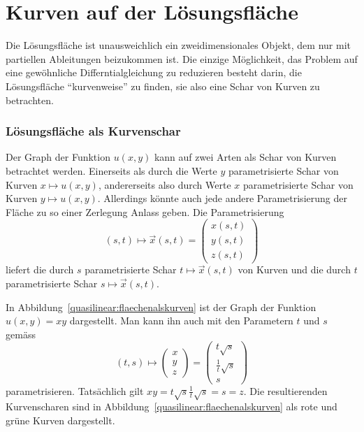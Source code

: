 \section{Kurven auf der Lösungsfläche}
Die Lösungsfläche ist unausweichlich ein zweidimensionales
Objekt, dem nur mit partiellen Ableitungen beizukommen ist.
Die einzige Möglichkeit, das Problem auf eine gewöhnliche
Differntialgleichung zu reduzieren besteht darin, die Lösungsfläche
``kurvenweise'' zu finden, sie also eine Schar von Kurven
zu betrachten.

\subsubsection{Lösungsfläche als Kurvenschar}
Der Graph der Funktion $u(x,y)$ kann auf zwei Arten als Schar von
Kurven betrachtet werden.
Einerseits als durch die Werte $y$
parametrisierte Schar von Kurven $x\mapsto u(x,y)$, andererseits
also durch Werte $x$ parametrisierte Schar von Kurven $y\mapsto u(x,y)$.
Allerdings könnte auch jede andere Parametrisierung der Fläche
zu so einer Zerlegung Anlass geben. Die Parametrisierung
\begin{equation}
(s,t)\mapsto \vec x(s,t)
=
\begin{pmatrix}x(s,t)\\y(s,t)\\z(s,t)\end{pmatrix}
\label{quasilinear:kurvenschar}
\end{equation}
liefert die durch $s$ parametrisierte Schar $t\mapsto \vec x(s,t)$
von Kurven und die durch $t$ parametrisierte Schar $s\mapsto\vec x(s,t)$.

In Abbildung~\ref{quasilinear:flaechenalskurven} ist der Graph der
Funktion $u(x,y)=xy$ dargestellt.
Man kann ihn auch mit den Parametern $t$ und $s$ gemäss
\begin{equation}
(t,s)
\mapsto
\begin{pmatrix}x\\y\\z\end{pmatrix}
=
\begin{pmatrix}t\sqrt{s}\\\frac1t\sqrt{s}\\s\end{pmatrix}
\label{quasliniear:flaechebeispiel}
\end{equation}
parametrisieren.
Tatsächlich gilt $xy = t\sqrt{s}\frac1t\sqrt{s}=s=z$.
Die resultierenden Kurvenscharen sind in
Abbildung~\ref{quasilinear:flaechenalskurven} als rote und grüne Kurven
dargestellt.

